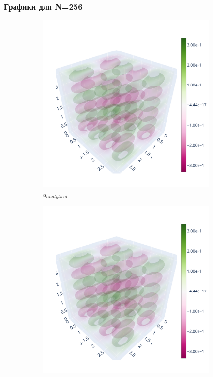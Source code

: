 \documentclass[a4paper,hidelinks,12pt]{article}
\begin{document}
\subsubsection{Графики для N=256}

\begin{figure}[H]
\begin{subfigure}{.33\textwidth}
  \centering
  \includegraphics[width=\linewidth]{pictures/1_Lpi_256_analytical.png}
  \caption{$u_{analytical}$}
\end{subfigure}%
\begin{subfigure}{.33\textwidth}
  \centering
  \includegraphics[width=\linewidth]{pictures/1_Lpi_256_calculated.png}

\end{subfigure}
\end{figure}
\end{document}
